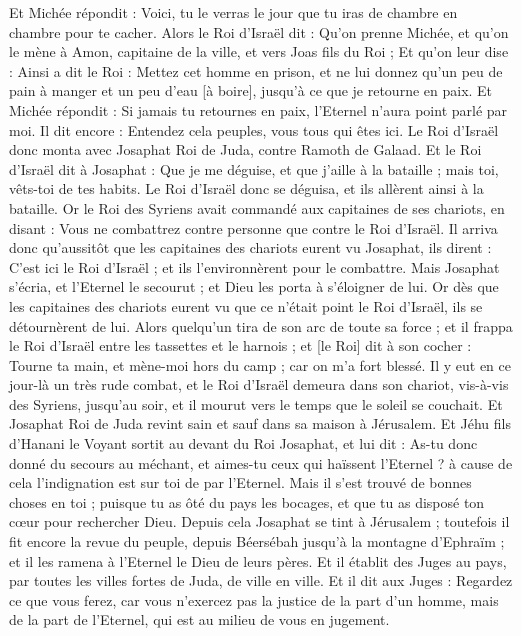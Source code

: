\begin{multicols}{2}
Et Michée répondit : Voici, tu le verras le jour que tu iras de chambre en chambre pour te cacher.
Alors le Roi d'Israël dit : Qu'on prenne Michée, et qu'on le mène à Amon, capitaine de la ville, et vers Joas fils du Roi ;
Et qu'on leur dise : Ainsi a dit le Roi : Mettez cet homme en prison, et ne lui donnez qu'un peu de pain à manger et un peu d'eau [à boire], jusqu'à ce que je retourne en paix.
Et Michée répondit : Si jamais tu retournes en paix, l'Eternel n'aura point parlé par moi. Il dit encore : Entendez cela peuples, vous tous qui êtes ici.
Le Roi d'Israël donc monta avec Josaphat Roi de Juda, contre Ramoth de Galaad.
Et le Roi d'Israël dit à Josaphat : Que je me déguise, et que j'aille à la bataille ; mais toi, vêts-toi de tes habits. Le Roi d'Israël donc se déguisa, et ils allèrent ainsi à la bataille.
Or le Roi des Syriens avait commandé aux capitaines de ses chariots, en disant : Vous ne combattrez contre personne que contre le Roi d'Israël.
Il arriva donc qu'aussitôt que les capitaines des chariots eurent vu Josaphat, ils dirent : C'est ici le Roi d'Israël ; et ils l'environnèrent pour le combattre. Mais Josaphat s'écria, et l'Eternel le secourut ; et Dieu les porta à s'éloigner de lui.
Or dès que les capitaines des chariots eurent vu que ce n'était point le Roi d'Israël, ils se détournèrent de lui.
Alors quelqu'un tira de son arc de toute sa force ; et il frappa le Roi d'Israël entre les tassettes et le harnois ; et [le Roi] dit à son cocher : Tourne ta main, et mène-moi hors du camp ; car on m'a fort blessé.
Il y eut en ce jour-là un très rude combat, et le Roi d'Israël demeura dans son chariot, vis-à-vis des Syriens, jusqu'au soir, et il mourut vers le temps que le soleil se couchait.
\VerseOne{}Et Josaphat Roi de Juda revint sain et sauf dans sa maison à Jérusalem.
Et Jéhu fils d'Hanani le Voyant sortit au devant du Roi Josaphat, et lui dit : As-tu donc donné du secours au méchant, et aimes-tu ceux qui haïssent l'Eternel ? à cause de cela l'indignation est sur toi de par l'Eternel.
Mais il s'est trouvé de bonnes choses en toi ; puisque tu as ôté du pays les bocages, et que tu as disposé ton cœur pour rechercher Dieu.
Depuis cela Josaphat se tint à Jérusalem ; toutefois il fit encore la revue du peuple, depuis Béersébah jusqu'à la montagne d'Ephraïm ; et il les ramena à l'Eternel le Dieu de leurs pères.
Et il établit des Juges au pays, par toutes les villes fortes de Juda, de ville en ville.
Et il dit aux Juges : Regardez ce que vous ferez, car vous n'exercez pas la justice de la part d'un homme, mais de la part de l'Eternel, qui est au milieu de vous en jugement.

\end{multicols}
